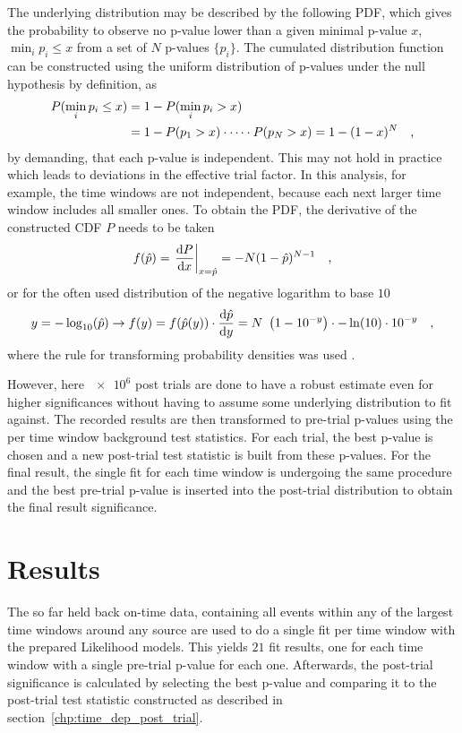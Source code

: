 The underlying distribution may be described by the following PDF, which gives the probability to observe no p-value lower than a given minimal p-value $x$, $\min_i{p_i} \leq x$ from a set of $N$ p-values $\{p_i\}$.
The cumulated distribution function can be constructed using the uniform distribution of p-values under the null hypothesis by definition, as
\begin{align}
  P(\min_i{p_i} \leq x)
  &= 1 - P(\min_i{p_i} > x) \\
  &= 1 - P(p_1 > x)\cdot\dots\cdot P(p_N > x)
  = 1 - (1-x)^N
  \quad\text{,}
\end{align}
by demanding, that each p-value is independent.
This may not hold in practice which leads to deviations in the effective trial factor.
In this analysis, for example, the time windows are not independent, because each next larger time window includes all smaller ones.
To obtain the PDF, the derivative of the constructed CDF $P$ needs to be taken
\begin{equation}
  f(\hat{p})
  = \left. \frac{\mathrm{d}P}{\mathrm{d}x} \right|_{x=\hat{p}}
  = -N(1 - \hat{p})^{N-1}
  \quad\text{,}
\end{equation}
or for the often used distribution of the negative logarithm to base $\num{10}$
\begin{equation}
  y = -\log_{10}(\hat{p})
  \rightarrow
  f(y) = f(\hat{p}(y))\cdot\dd{\hat{p}}{y}
  = N \left( 1 - 10^{-y} \right) \cdot -\ln(10)\cdot 10^{-y}
  \mcomma
\end{equation}
where the rule for transforming probability densities was used .

However, here $\num{e6}$ post trials are done to have a robust estimate even for higher significances without having to assume some underlying distribution to fit against.
The recorded results are then transformed to pre-trial p-values using the per time window background test statistics.
For each trial, the best p-value is chosen and a new post-trial test statistic is built from these p-values.
For the final result, the single fit for each time window is undergoing the same procedure and the best pre-trial p-value is inserted into the post-trial distribution to obtain the final result significance.

\section{Results}
The so far held back on-time data, containing all events within any of the largest time windows around any source are used to do a single fit per time window with the prepared Likelihood models.
This yields $\num{21}$ fit results, one for each time window with a single pre-trial p-value for each one.
Afterwards, the post-trial significance is calculated by selecting the best p-value and comparing it to the post-trial test statistic constructed as described in section~\ref{chp:time_dep_post_trial}.

